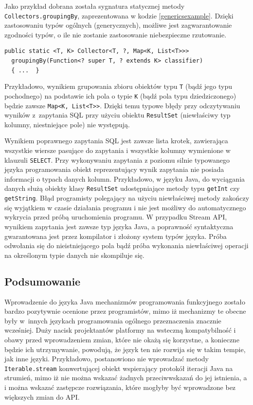 \documentclass[12pt,twoside,openright]{extarticle}
\begin{document}
    Jako przykład dobrana została sygnatura statycznej metody \newline \texttt{Collectors.groupingBy}, zaprezentowana w kodzie \ref{genericsexample}. Dzięki zastosowaniu typów ogólnych \cite{generics} (generycznych), możliwe jest zagwarantowanie zgodności typów, o ile nie zostanie zastosowanie niebezpieczne rzutowanie.

\begin{lstlisting}[label=genericsexample, caption=Sygnatura metody grupującej]
  public static <T, K> Collector<T, ?, Map<K, List<T>>>
  groupingBy(Function<? super T, ? extends K> classifier) 
  { ...  }
\end{lstlisting}

    Przykładowo, wynikiem grupowania zbioru obiektów typu \texttt{T} (bądź jego typu pochodnego) na podstawie ich pola o typie \texttt{K} (bądź pola typu dziedziczonego) będzie zawsze \texttt{Map<K, List<T>}\texttt{>}. Dzięki temu typowe błędy przy odczytywaniu wyników z~zapytania SQL przy użyciu obiektu \texttt{ResultSet} (niewłaściwy typ kolumny, niestniejące pole) nie występują.

    Wynikiem poprawnego zapytania SQL jest zawsze lista krotek, zawierająca wszystkie wiersze pasujące do zapytania i wszystkie kolumny wymienione w klauzuli \texttt{SELECT}. Przy wykonywaniu zapytania z poziomu silnie typowanego języka programowania obiekt reprezentujący wynik zapytania nie posiada informacji o typach danych kolumn. Przykładowo, w języku Java, do wyciągania danych służą obiekty klasy \texttt{ResultSet} udostępniające metody typu \texttt{getInt} czy \texttt{getString}. Błąd programisty polegający na użyciu niewłaściwej metody zakończy się wyjątkiem w czasie działania programu i nie jest możliwy do automatycznego wykrycia przed próbą uruchomienia programu. W przypadku Stream API, wynikiem zapytania jest zawsze typ języka Java, a poprawność syntaktyczna gwarantowana jest przez kompilator i złożony system typów języka. Próba odwołania się do nieistniejącego pola bądź próba wykonania niewłaściwej operacji na określonym typie danych nie skompiluje się. 

\subsection{Podsumowanie}

    Wprowadzenie do języka Java mechanizmów programowania funkcyjnego zostało bardzo pozytywnie ocenione przez programistów, mimo iż mechanizmy te obecne były w~innych językach programowania ogólnego przeznaczenia znacznie wcześniej. Duży nacisk projektantów platformy na wsteczną kompatybilność i obawy przed wprowadzeniem zmian, które nie okażą się korzystne, a konieczne będzie ich utrzymywanie, powodują, że język ten nie rozwija się w takim tempie, jak inne języki. Przykładowo, postanowiono nie wprowadzać metody \texttt{Iterable.stream} konwertującej obiekt wspierający protokół iteracji Java na strumień, mimo iż nie można wskazać żadnych przeciwwskazań do jej istnienia, a i można wskazać zastępcze rozwiązania, które mogłyby być wprowadzone bez większych zmian do API.
\end{document}
